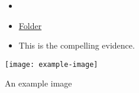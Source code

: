 \documentclass{report}
\newenvironment{evidence}
{
\begin{evidenceBox}
}
{
\end{evidenceBox}
}
\begin{document}
\begin{evidence}
  \vspace{-\topsep}%

  \begin{itemize}[leftmargin=*]
    \setlength{\parskip}{0pt}
    \setlength{\itemsep}{0pt plus 1pt}
  \item \blindtext
  \item \href{https://drive.google.com/a/cmis.ac.th/folderview?id=0ByVFfrm0zfolWE0yenprdktGVlk&usp=sharing}{Folder}
  \item This is the compelling evidence.
  \end{itemize}

  \captionsetup{type=figure}
  \texttt{[image: example-image]}
  \caption{An example image}\label{fig:fig1}


\end{evidence}
\end{document}
